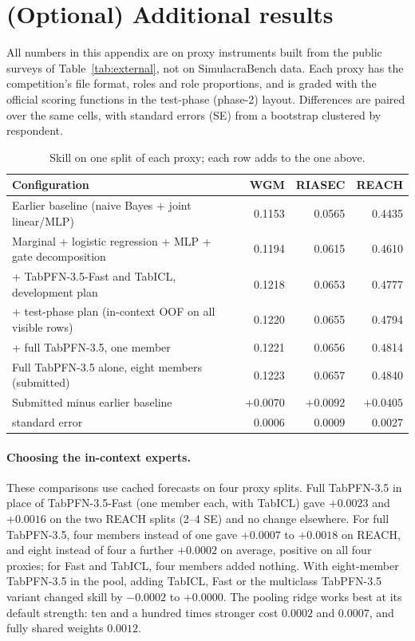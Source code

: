 \documentclass{article}
\begin{document}
\section{(Optional) Additional results}
\label{app:results}

All numbers in this appendix are on proxy instruments built from the public surveys of
Table~\ref{tab:external}, not on SimulacraBench data. Each proxy has the competition's file
format, roles and role proportions, and is graded with the official scoring functions in the
test-phase (phase-2) layout. Differences are paired over the same cells, with standard errors
(SE) from a bootstrap clustered by respondent.

\begin{table}[h]
  \centering
  \small
  \caption{Skill on one split of each proxy; each row adds to the one above.}
  \label{tab:ablation}
  \begin{tabular}{@{}lrrr@{}}
    \toprule
    Configuration & WGM & RIASEC & REACH \\
    \midrule
    Earlier baseline (naive Bayes + joint linear/MLP) & 0.1153 & 0.0565 & 0.4435 \\
    Marginal + logistic regression + MLP + gate decomposition & 0.1194 & 0.0615 & 0.4610 \\
    + TabPFN-3.5-Fast and TabICL, development plan & 0.1218 & 0.0653 & 0.4777 \\
    + test-phase plan (in-context OOF on all visible rows) & 0.1220 & 0.0655 & 0.4794 \\
    + full TabPFN-3.5, one member & 0.1221 & 0.0656 & 0.4814 \\
    Full TabPFN-3.5 alone, eight members (submitted) & 0.1223 & 0.0657 & 0.4840 \\
    \midrule
    Submitted minus earlier baseline & $+0.0070$ & $+0.0092$ & $+0.0405$ \\
    \quad standard error & 0.0006 & 0.0009 & 0.0027 \\
    \bottomrule
  \end{tabular}
\end{table}

\paragraph{Choosing the in-context experts.} These comparisons use cached forecasts on four
proxy splits. Full TabPFN-3.5 in place of TabPFN-3.5-Fast (one member each, with TabICL) gave
$+0.0023$ and $+0.0016$ on the two REACH splits (2--4 SE) and no change elsewhere. For full
TabPFN-3.5, four members instead of one gave $+0.0007$ to $+0.0018$ on REACH, and eight instead of
four a further $+0.0002$ on average, positive on all four proxies; for Fast and TabICL, four
members added nothing. With eight-member TabPFN-3.5 in the pool, adding TabICL, Fast or the
multiclass TabPFN-3.5 variant changed skill by $-0.0002$ to $+0.0000$. The pooling ridge works
best at its default strength: ten and a hundred times stronger cost $0.0002$ and $0.0007$, and
fully shared weights $0.0012$.
\end{document}
